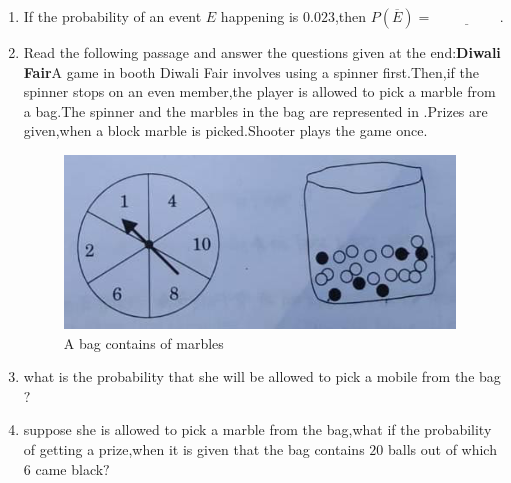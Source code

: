\begin{enumerate}
\item If the probability of an event $E$ happening is $0.023$,then $P(\overline{E})=\underline{\hspace{2cm}}$.
\item Read the following passage and answer the questions given at the end:\newline\textbf{Diwali Fair}\newline A game in booth Diwali Fair involves using a spinner first.Then,if the spinner stops on an even member,the player is allowed to pick a marble from a bag.The spinner and the marbles in the bag are represented in .\newline Prizes are given,when a block marble is picked.Shooter plays the game once.
\begin{figure}[H]
\centering
\includegraphics[width=\columnwidth]{figs/PROB.PNG}
\caption{A bag contains of marbles}
\label{fig:PROB.PNG}
\end{figure}

\item what is the probability that she will be allowed to pick a mobile from the bag$?$
\item suppose she is allowed to pick a marble from the bag,what if the probability of getting a prize,when it is given that the bag contains $20$ balls out of which $6$ came black$?$

\end{enumerate}
